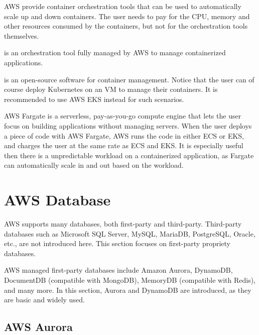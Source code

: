 AWS provide container orchestration tools that can be used to automatically scale up and down containers. The user needs to pay for the CPU, memory and other resources consumed by the containers, but not for the orchestration tools themselves.

 is an orchestration tool fully managed by AWS to manage containerized applications. 

 is an open-source software for container management. Notice that the user can of course deploy Kubernetes on an VM to manage their containers. It is recommended to use AWS EKS instead for such scenarios. 

AWS Fargate is a serverless, pay-as-you-go compute engine that lets the user focus on building applications without managing servers. When the user deploys a piece of code with AWS Fargate, AWS runs the code in either ECS or EKS, and charges the user at the same rate as ECS and EKS. It is especially useful then there is a unpredictable workload on a containerized application, as Fargate can automatically scale in and out based on the workload.

\section{AWS Database}

AWS supports many databases, both first-party and third-party. Third-party databases such as Microsoft SQL Server, MySQL, MariaDB, PostgreSQL, Oracle, etc., are not introduced here. This section focuses on first-party propriety databases.

AWS managed first-party databases include Amazon Aurora, DynamoDB, DocumentDB (compatible with MongoDB), MemoryDB (compatible with Redis), and many more. In this section, Aurora and DynamoDB are introduced, as they are basic and widely used.

\subsection{AWS Aurora}

